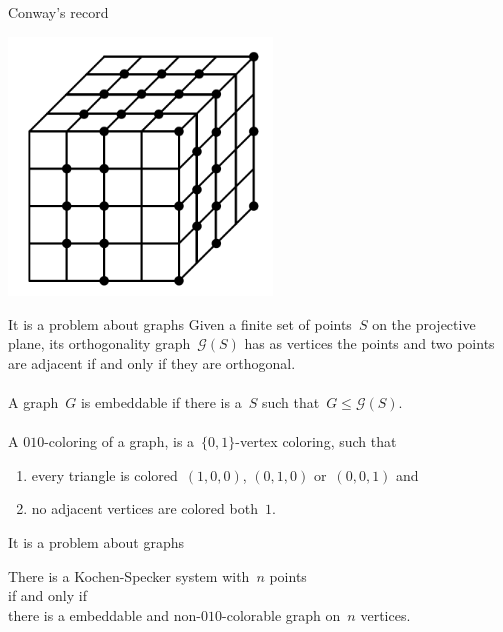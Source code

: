 \documentclass{beamer}
\begin{document}
\begin{frame}{Conway's record}
    \begin{center}
        \includegraphics[width=7cm]{../graphs/ks31.png}
    \end{center}
\end{frame}

\begin{frame}{It is a problem about graphs}
    Given a finite set of points~$S$ on the projective plane,
    its \alert{orthogonality graph}~$\mathcal{G}(S)$
    has as vertices the points
    and two points are adjacent if and only if they are orthogonal.
    \pause
    \\~\\
    A graph~$G$ is \alert{embeddable}
    if there is a~$S$
    such that~$G \leq \mathcal{G}(S)$.
    \pause
    \\~\\
    A \alert{$010$-coloring} of a graph, is a~$\{0,1\}$-vertex coloring,
    such that
    \begin{enumerate}
        \item every triangle is colored~$(1,0,0)$, $(0,1,0)$ or~$(0,0,1)$ and
        \item no adjacent vertices are colored both~$1$.
    \end{enumerate}
\end{frame}

\begin{frame}{It is a problem about graphs}
    \begin{center}
    There is a Kochen-Specker system with~$n$ points \\
    if and only if \\
    there is a \alert{embeddable} and \alert{non-$010$-colorable}
            graph on~$n$ vertices.
    \end{center}
\end{frame}
\end{document}
